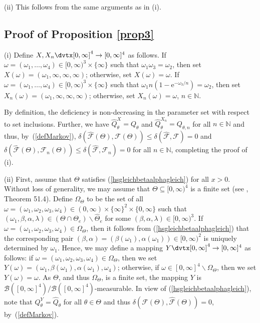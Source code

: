 \documentclass[number,citesort,seceqn,dvips]{arxbj}
\newcommand{\eqref}[1]{(\ref{#1})}
\newcommand{\NN}{\mathbb{N}}
\newcommand{\BBB}{{\mathcal B}}
\newcommand{\FFF}{{\mathcal F}}
\begin{document}
(ii)   This follows from the same arguments as in (i).
%
\subsection{\texorpdfstring{Proof of Proposition \protect\ref{prop3}}{Proof of Proposition 2.3}}\label{proofprop3}
(i)   Define $X,X_n\dvtx[0,\infty]^4\to[0,\infty]^4$ as follows. If
$\omega=(\omega_1,\dots,\omega_4)\in[0,\infty)^3\times\{\infty\}
$ such
that $\omega_1\omega_3=\omega_2$, then set
$X(\omega)=(\omega_1,\infty,\infty,\infty)$; otherwise, set
$X(\omega)=\omega$. If $\omega=(\omega_1,\dots,\omega_4)\in
[0,\infty)^3\times\{\infty\}$ such that $\omega_1
n(1-\mathrm{e}^{-\omega_3/n})=\omega_2$, then set
$X_n(\omega)=(\omega_1,\infty,\infty,\infty)$; otherwise, set
$X_n(\omega)=\omega$, $n\in\NN$.

By definition, the deficiency is non-decreasing in the parameter set
with respect to set inclusions. Further, we have $\widehat
Q^X_{\theta}=Q_{\theta}$ and $\widehat Q^{X_n}_{\theta}= Q_{\theta,n}$
for all $n\in\NN$ and thus, by~\eqref{defMarkov},
$\delta(\widehat\FFF(\Theta),\FFF(\Theta))\le
\delta(\widehat\FFF,\FFF)=0$ and
$\delta(\widehat\FFF(\Theta),\FFF_n(\Theta))\le
\delta(\widehat\FFF,\FFF_n)=0$
for all $n\in\NN$, completing the proof of (i).

(ii)   First, assume that $\Theta$ satisfies
\eqref{hsgleichbetaalphagleich} for all $x>0$. Without loss of
generality, we may assume that $\Theta\subseteq[0,\infty)^4$ is a
finite set (see \cite{St85}, Theorem 51.4). Define $\Omega_\Theta$ to
be the set of all $\omega=(\omega_1,\omega_2,\omega_3,\omega_4)
\in(0,\infty)\times\{\infty\}^2\times\{0,\infty\}$ such that $(
\omega_1,\beta,\alpha,\lambda)\in(\Theta\cap\Theta_e)\backslash
\widehat\Theta_e$
for some $(\beta,\alpha,\lambda)\in[0,\infty)^3$. If
$\omega=(\omega_1,\omega_2,\omega_3,\omega_4)\in\Omega_\Theta$,
then it
follows from \eqref{hsgleichbetaalphagleich} that the corresponding
pair $(\beta,\alpha)=(\beta(\omega_1),\alpha(\omega_1))\in
[0,\infty)^2$
is uniquely determined by $\omega_1$. Hence, we may define a mapping
$Y\dvtx[0,\infty]^4\to[0,\infty]^4$ as follows: if
$\omega=(\omega_1,\omega_2,\omega_3,\omega_4)\in\Omega_\Theta$,
then we
set $Y(\omega)=( \omega_1,\beta(\omega_1),\alpha(\omega_1),\omega_4)$;
otherwise, if $\omega\in[0,\infty]^4\backslash\Omega_\Theta$,
then we
set $Y(\omega)=\omega$. As $\Theta$, and thus $\Omega_\Theta$, is a
finite set, the mapping $Y$ is
$\BBB([0,\infty]^4)/\BBB([0,\infty]^4)$-measurable. In view of
\eqref{hsgleichbetaalphagleich}, note that $Q^Y_\theta=\widehat
Q_\theta$ for all $\theta\in\Theta$ and thus
$\delta(\FFF(\Theta),\widehat\FFF(\Theta))=0$, by~\eqref{defMarkov}.
\end{document}
